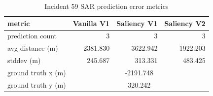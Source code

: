 \begin{table}[ht]
\centering
\caption{Incident 59 SAR prediction error metrics}
\label{tab:sar-incident-59}
\begin{tabular}{lrrr}
\hline
metric & Vanilla V1 & Saliency V1 & Saliency V2 \\
\hline
prediction count & 3 & 3 & 3 \\
avg distance (m) & 2381.830 & 3622.942 & 1922.203 \\
stddev (m) & 245.687 & 313.331 & 483.425 \\
ground truth x (m) & \multicolumn{3}{c}{-2191.748} \\
ground truth y (m) & \multicolumn{3}{c}{320.242} \\
\hline
\end{tabular}
\end{table}
